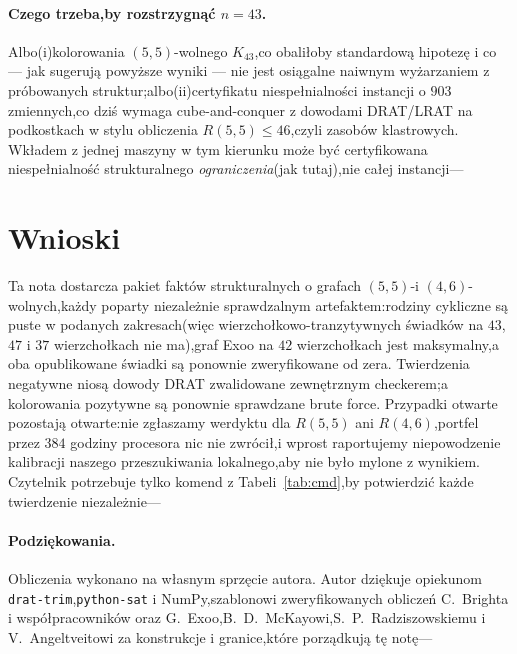 \documentclass[11pt]{article}
\theoremstyle{definition}
\theoremstyle{plain}
\newcommand{\K}{\ensuremath{K}}
\newcommand{\R}[2]{\ensuremath{R(#1,#2)}}
\begin{document}
\paragraph{Czego trzeba,by rozstrzygnąć $n = 43$.}
Albo(i)kolorowania $(5,5)$-wolnego $\K_{43}$,co obaliłoby standardową hipotezę i co --- jak sugerują powyższe wyniki --- nie jest osiągalne naiwnym wyżarzaniem z próbowanych struktur;albo(ii)certyfikatu niespełnialności instancji o $903$ zmiennych,co dziś wymaga cube-and-conquer z dowodami DRAT/LRAT na podkostkach w stylu obliczenia $\R{5}{5} \le 46$,czyli zasobów klastrowych. Wkładem z jednej maszyny w tym kierunku może być certyfikowana niespełnialność strukturalnego \emph{ograniczenia}(jak tutaj),nie całej instancji---

\section{Wnioski}

Ta nota dostarcza pakiet faktów strukturalnych o grafach $(5,5)$-i $(4,6)$-wolnych,każdy poparty niezależnie sprawdzalnym artefaktem:rodziny cykliczne są puste w podanych zakresach(więc wierzchołkowo-tranzytywnych świadków na $43$,$47$ i $37$ wierzchołkach nie ma),graf Exoo na $42$ wierzchołkach jest maksymalny,a oba opublikowane świadki są ponownie zweryfikowane od zera. Twierdzenia negatywne niosą dowody DRAT zwalidowane zewnętrznym checkerem;a kolorowania pozytywne są ponownie sprawdzane brute force. Przypadki otwarte pozostają otwarte:nie zgłaszamy werdyktu dla $\R{5}{5}$ ani $\R{4}{6}$,portfel przez $384$ godziny procesora nic nie zwrócił,i wprost raportujemy niepowodzenie kalibracji naszego przeszukiwania lokalnego,aby nie było mylone z wynikiem. Czytelnik potrzebuje tylko komend z Tabeli~\ref{tab:cmd},by potwierdzić każde twierdzenie niezależnie---

\paragraph{Podziękowania.}
Obliczenia wykonano na własnym sprzęcie autora. Autor dziękuje opiekunom \texttt{drat-trim},\texttt{python-sat} i NumPy,szablonowi zweryfikowanych obliczeń C.~Brighta i współpracowników oraz G.~Exoo,B.~D.~McKayowi,S.~P.~Radziszowskiemu i V.~Angeltveitowi za konstrukcje i granice,które porządkują tę notę---
\end{document}
